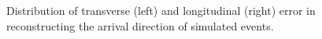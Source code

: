 \begin{figure}[p]
%
\caption{\label{FIG::APPELLIPT::ERRORDISTRIBUTIONS} Distribution of 
transverse (left) and longitudinal (right) error in reconstructing
the arrival direction of simulated events.}
\end{figure}

